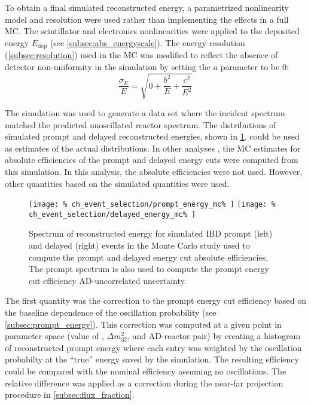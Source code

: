 To obtain a final simulated reconstructed energy,
a parametrized nonlinearity model and resolution were used
rather than implementing the effects in a full MC.
The scintillator and electronics nonlinearities were applied
to the deposited energy $E_{\text{dep}}$
(see \cref{subsec:abs_energyscale}).
The energy resolution (\cref{subsec:resolution}) used in the MC
was modified to reflect
the absence of detector non-uniformity in the simulation
by setting the $a$ parameter to be 0:
\begin{equation}
    \frac{\sigma_E}{E} = \sqrt{0 + \frac{b^2}{E} + \frac{c^2}{E^2}}
\end{equation}

The simulation was used to generate a data set
where the incident \nuebar{} spectrum
matched the predicted unoscillated reactor \nuebar{} spectrum.
The distributions of simulated prompt and delayed reconstructed energies,
shown in \cref{fig:prompt_eff_mc},
could be used as estimates of the actual distributions.
In other analyses \cite{nh2016}, the MC estimates
for absolute efficiencies of the prompt and delayed energy cuts
were computed from this simulation.
In this analysis, the absolute efficiencies were not used.
However, other quantities based on the simulated quantities
were used.

\begin{figure}
    \centering
    \texttt{[image: \%
        ch\_event\_selection/prompt\_energy\_mc\%
    ]}
    \texttt{[image: \%
        ch\_event\_selection/delayed\_energy\_mc\%
    ]}
    \caption{Spectrum of reconstructed energy for simulated IBD prompt (left)
        and delayed (right) events
        in the Monte Carlo study used to compute the prompt and delayed
        energy cut absolute efficiencies.
        The prompt spectrum is also used to compute the prompt energy cut
    efficiency AD-uncorrelated uncertainty.}
    \label{fig:prompt_eff_mc}
\end{figure}

The first quantity was the correction to the prompt energy cut efficiency
based on the baseline dependence of the oscillation probability
(see \cref{subsec:prompt_energy}).
This correction was computed at a given point in parameter space
(value of \thetaot{}, $\Delta m^2_{32}$, and AD-reactor pair)
by creating a histogram of reconstructed prompt energy
where each entry was weighted by the oscillation probabilty
at the ``true'' \nuebar{} energy saved by the simulation.
The resulting efficiency could be compared
with the nominal efficiency assuming no oscillations.
The relative difference was applied as a correction
during the near-far projection procedure in \cref{subsec:flux_fraction}.

